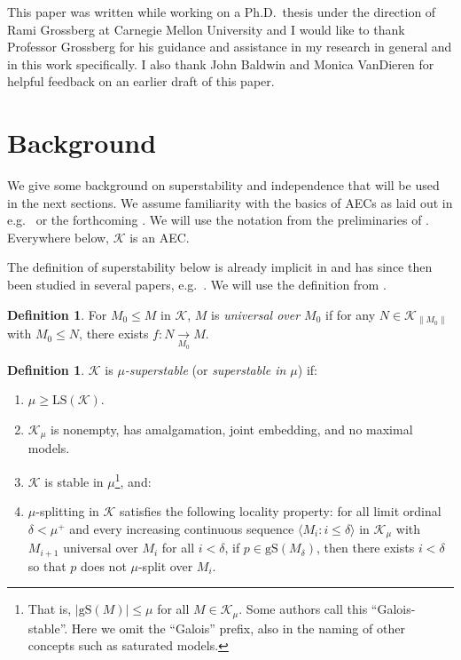 \documentclass[12pt]{amsart}
\theoremstyle{definition}
\newtheorem{defin}[mydef]{Definition}
\begin{document}
This paper was written while working on a Ph.D.\ thesis under the direction of Rami Grossberg at Carnegie Mellon University and I would like to thank Professor Grossberg for his guidance and assistance in my research in general and in this work specifically. I also thank John Baldwin and Monica VanDieren for helpful feedback on an earlier draft of this paper.

\section{Background}

We give some background on superstability and independence that will be used in the next sections. We assume familiarity with the basics of AECs as laid out in e.g.\ \cite{baldwinbook09} or the forthcoming \cite{grossbergbook}. We will use the notation from the preliminaries of \cite{sv-infinitary-stability-v3}. Everywhere below, ${\mathcal{K}}$ is an AEC.

The definition of superstability below is already implicit in \cite{shvi635} and has since then been studied in several papers, e.g.\ \cite{vandierennomax, gvv-toappear-v1_2, indep-aec-v5, bv-sat-v3, gv-superstability-v2, vv-symmetry-transfer-v2}. We will use the definition from \cite[Definition 10.1]{indep-aec-v5}.

\begin{defin}
  For $M_0 {\le} M$ in ${\mathcal{K}}$, $M$ is \emph{universal over $M_0$} if for any $N \in {\mathcal{K}}_{\|M_0\|}$ with $M_0 {\le} N$, there exists $f: N \xrightarrow[M_0]{} M$.
\end{defin}

\begin{defin}\label{ss assm}
  ${\mathcal{K}}$ is \emph{$\mu$-superstable} (or \emph{superstable in $\mu$}) if:

  \begin{enumerate}
    \item $\mu \ge {\text{LS}} ({\mathcal{K}})$.
    \item ${\mathcal{K}}_\mu$ is nonempty, has amalgamation, joint embedding, and no maximal models.
    \item ${\mathcal{K}}$ is stable in $\mu$\footnote{That is, $|{\text{gS}} (M)| \le \mu$ for all $M \in {\mathcal{K}}_\mu$. Some authors call this ``Galois-stable''. Here we omit the ``Galois'' prefix, also in the naming of other concepts such as saturated models.}, and:
    \item\label{split assm} $\mu$-splitting in ${\mathcal{K}}$ satisfies the following
  locality property: for all limit ordinal $\delta < \mu^+$ and every increasing continuous sequence ${\langle {M_i : i \le \delta} \rangle}$ in ${\mathcal{K}}_\mu$ with $M_{i + 1}$ universal over $M_i$ for all $i < \delta$, if $p \in {\text{gS}} (M_\delta)$, then there exists $i < \delta$ so that $p$ does not $\mu$-split over $M_i$.
  \end{enumerate}
\end{defin}
\end{document}
